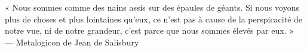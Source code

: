 
\thispagestyle{empty}


\vspace*{3cm}

\begin{raggedleft}
« Nous sommes comme des nains assis sur des épaules de géants. Si nous voyons plus de choses et plus lointaines qu’eux, ce n’est pas à cause de la perspicacité de notre vue, ni de notre grandeur, c’est parce que nous sommes élevés par eux. » \\
     --- Metalogicon de Jean de Salisbury\\
\end{raggedleft}

\vspace{4cm}



